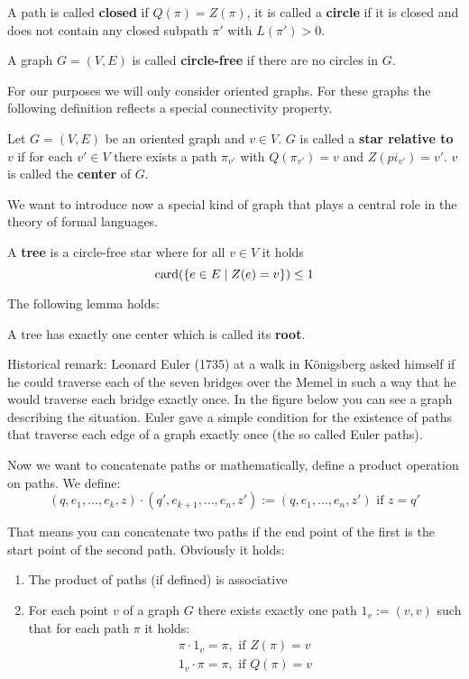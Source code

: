 A path is called {\bf closed} if $Q(\pi) = Z(\pi)$, it is called a {\bf circle}
if it is closed and does not contain any closed subpath $\pi'$ with $L(\pi') >
0$.

\begin{definition}
A graph $G = (V, E)$ is called {\bf circle-free} if there are no circles in $G$.
\end{definition}

For our purposes we will only consider oriented graphs. For these graphs the
following definition reflects a special connectivity property.

\begin{definition}
Let $G = (V, E)$ be an oriented graph and $v \in V$. $G$ is called a {\bf star
relative to $v$} if for each $v' \in V$ there exists a path $\pi_{v'}$ with
$Q(\pi_{v'}) = v$ and $Z(pi_{v'}) = v'$. $v$ is called the {\bf center} of $G$.
\end{definition} 

We want to introduce now a special kind of graph that plays a central role in
the theory of formal languages.

\begin{definition}
A {\bf tree} is a circle-free star where for all $v \in V$ it holds
\[ \mathrm{card}({\mbox{$\{e \in E \mid Z(e) = v\}$}}) \leq 1 \]
\end{definition}

The following lemma holds:
\begin{lemma}
A tree has exactly one center which is called its {\bf root}.
\end{lemma}

Historical remark: Leonard Euler (1735) at a walk in Königsberg asked himself if
he could traverse each of the seven bridges over the Memel in such
a way that he would traverse each bridge exactly once. In the figure below you
can see a graph describing the situation. Euler gave a simple condition for the
existence of paths that traverse each edge of a graph exactly once (the so
called Euler paths).

\missingfigure

Now we want to concatenate paths or mathematically, define a product operation
on paths. We define:
\[ (q, e_1, \ldots, e_k, z) \cdot (q', e_{k+1}, \ldots, e_n, z') := (q, e_1,
\ldots, e_n, z')\text{ if } z = q' \]

That means you can concatenate two paths if the end point of the first is the
start point of the second path. Obviously it holds:
\begin{enumerate}
  \item The product of paths (if defined) is associative
  \item For each point $v$ of a graph $G$ there exists exactly one path $1_v :=
  (v, v)$ such that for each path $\pi$ it holds:
  	\begin{eqnarray*}
    	\pi \cdot 1_v = \pi,\text{ if }Z(\pi) = v \\
    	1_v \cdot \pi = \pi,\text{ if }Q(\pi) = v
  	\end{eqnarray*}
\end{enumerate}

